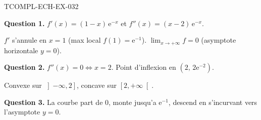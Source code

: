 \begin{corrige}{TCOMPL-ECH-EX-032}

\textbf{Question 1.} $f'(x) = (1-x)\,\mathrm{e}^{-x}$ et $f''(x) = (x-2)\,\mathrm{e}^{-x}$.


$f'$ s'annule en $x=1$ (max local $f(1)=\mathrm{e}^{-1}$). $\lim_{x\to+\infty} f = 0$ (asymptote horizontale $y=0$).

\textbf{Question 2.} $f''(x) = 0 \iff x = 2$. Point d'inflexion en $(2,\, 2\mathrm{e}^{-2})$.

Convexe sur $\left]-\infty, 2\right]$, concave sur $\left[2, +\infty\right[$.

\textbf{Question 3.} La courbe part de $0$, monte jusqu'a $\mathrm{e}^{-1}$, descend en s'incurvant vers l'asymptote $y=0$.

\end{corrige}

